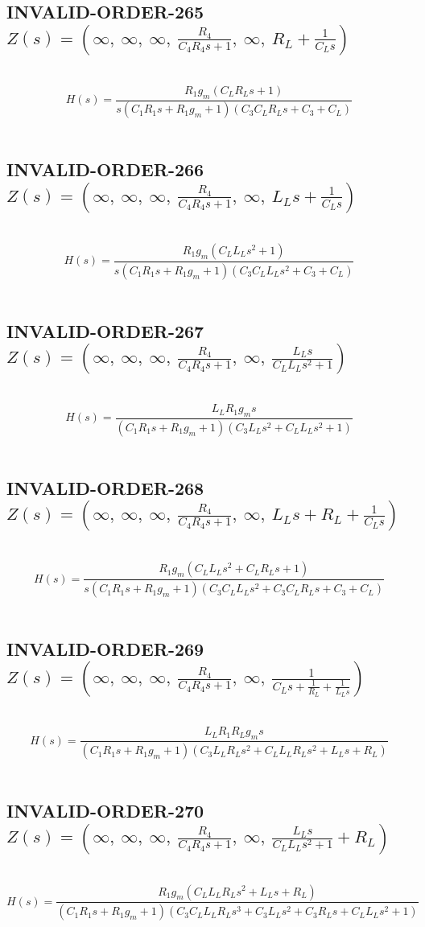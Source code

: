 \documentclass{article}
\begin{document}
\subsection{INVALID-ORDER-265 $Z(s) = \left( \infty, \  \infty, \  \infty, \  \frac{R_{4}}{C_{4} R_{4} s + 1}, \  \infty, \  R_{L} + \frac{1}{C_{L} s}\right)$ } \ 
\textbf{\[H(s) = \frac{R_{1} g_{m} \left(C_{L} R_{L} s + 1\right)}{s \left(C_{1} R_{1} s + R_{1} g_{m} + 1\right) \left(C_{3} C_{L} R_{L} s + C_{3} + C_{L}\right)}\] } \ 
\subsection{INVALID-ORDER-266 $Z(s) = \left( \infty, \  \infty, \  \infty, \  \frac{R_{4}}{C_{4} R_{4} s + 1}, \  \infty, \  L_{L} s + \frac{1}{C_{L} s}\right)$ } \ 
\textbf{\[H(s) = \frac{R_{1} g_{m} \left(C_{L} L_{L} s^{2} + 1\right)}{s \left(C_{1} R_{1} s + R_{1} g_{m} + 1\right) \left(C_{3} C_{L} L_{L} s^{2} + C_{3} + C_{L}\right)}\] } \ 
\subsection{INVALID-ORDER-267 $Z(s) = \left( \infty, \  \infty, \  \infty, \  \frac{R_{4}}{C_{4} R_{4} s + 1}, \  \infty, \  \frac{L_{L} s}{C_{L} L_{L} s^{2} + 1}\right)$ } \ 
\textbf{\[H(s) = \frac{L_{L} R_{1} g_{m} s}{\left(C_{1} R_{1} s + R_{1} g_{m} + 1\right) \left(C_{3} L_{L} s^{2} + C_{L} L_{L} s^{2} + 1\right)}\] } \ 
\subsection{INVALID-ORDER-268 $Z(s) = \left( \infty, \  \infty, \  \infty, \  \frac{R_{4}}{C_{4} R_{4} s + 1}, \  \infty, \  L_{L} s + R_{L} + \frac{1}{C_{L} s}\right)$ } \ 
\textbf{\[H(s) = \frac{R_{1} g_{m} \left(C_{L} L_{L} s^{2} + C_{L} R_{L} s + 1\right)}{s \left(C_{1} R_{1} s + R_{1} g_{m} + 1\right) \left(C_{3} C_{L} L_{L} s^{2} + C_{3} C_{L} R_{L} s + C_{3} + C_{L}\right)}\] } \ 
\subsection{INVALID-ORDER-269 $Z(s) = \left( \infty, \  \infty, \  \infty, \  \frac{R_{4}}{C_{4} R_{4} s + 1}, \  \infty, \  \frac{1}{C_{L} s + \frac{1}{R_{L}} + \frac{1}{L_{L} s}}\right)$ } \ 
\textbf{\[H(s) = \frac{L_{L} R_{1} R_{L} g_{m} s}{\left(C_{1} R_{1} s + R_{1} g_{m} + 1\right) \left(C_{3} L_{L} R_{L} s^{2} + C_{L} L_{L} R_{L} s^{2} + L_{L} s + R_{L}\right)}\] } \ 
\subsection{INVALID-ORDER-270 $Z(s) = \left( \infty, \  \infty, \  \infty, \  \frac{R_{4}}{C_{4} R_{4} s + 1}, \  \infty, \  \frac{L_{L} s}{C_{L} L_{L} s^{2} + 1} + R_{L}\right)$ } \ 
\textbf{\[H(s) = \frac{R_{1} g_{m} \left(C_{L} L_{L} R_{L} s^{2} + L_{L} s + R_{L}\right)}{\left(C_{1} R_{1} s + R_{1} g_{m} + 1\right) \left(C_{3} C_{L} L_{L} R_{L} s^{3} + C_{3} L_{L} s^{2} + C_{3} R_{L} s + C_{L} L_{L} s^{2} + 1\right)}\] } \ 
\end{document}
